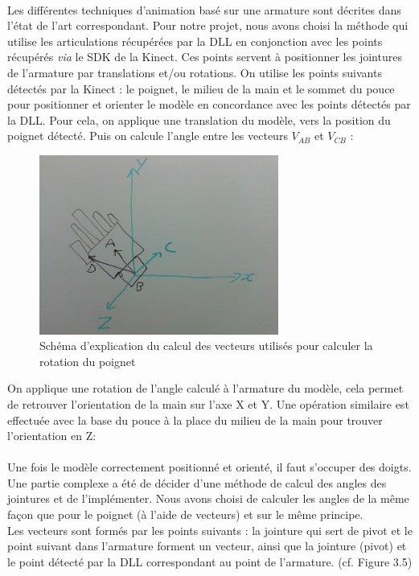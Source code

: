 \paragraph{}
Les différentes techniques d'animation basé sur une armature sont décrites dans l'état de l'art correspondant. 
Pour notre projet, nous avons choisi la méthode qui utilise les articulations récupérées par la DLL en conjonction avec les points récupérés \textit{via} le SDK de la Kinect. 
Ces points servent à positionner les jointures de l'armature par translations et/ou rotations.\newline
On utilise les points suivants détectés par la Kinect : le poignet, le milieu de la main et le sommet du pouce pour positionner et orienter le modèle en concordance avec les points détectés par la DLL.
Pour cela, on applique une translation du modèle, vers la position du poignet détecté. Puis on calcule l'angle entre les vecteurs $V_{AB}$ et $V_{CB}$  : 

\begin{figure}[H]
\centering
\includegraphics[width=0.7\textwidth]{images/SchemaRotationMain.jpg}
\caption{Schéma d'explication du calcul des vecteurs utilisés pour calculer la rotation du poignet}
\end{figure}

On applique une rotation de l'angle calculé à l'armature du modèle, cela permet de retrouver l'orientation de la main sur l'axe X et Y.
Une opération similaire est effectuée avec la base du pouce à la place du milieu de la main pour trouver l'orientation en Z: 


\paragraph{}

Une fois le modèle correctement positionné et orienté, il faut s'occuper des doigts. Une partie complexe a été de décider d'une méthode de calcul des angles des jointures et de l'implémenter.
Nous avons choisi de calculer les angles de la même façon que pour le poignet (à l'aide de vecteurs) et sur le même principe.\\
Les vecteurs sont formés par les points suivants : la jointure qui sert de pivot et le point suivant dans l'armature forment un vecteur, ainsi que la jointure (pivot) et le point détecté par la DLL correspondant au point de l'armature. (cf. Figure 3.5)

